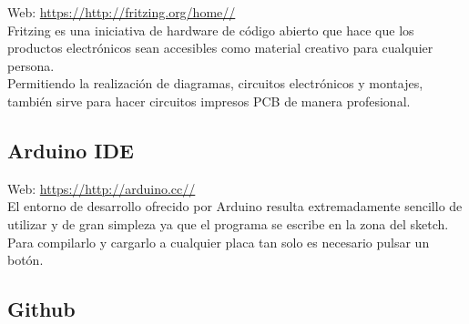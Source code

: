 
Web: \url{https://http://fritzing.org/home//} \cite{website:1} \\

Fritzing es una iniciativa de hardware de código abierto que hace que los productos electrónicos sean accesibles como material creativo para cualquier persona.\\

Permitiendo la realización de diagramas, circuitos electrónicos y montajes, también sirve para hacer circuitos impresos PCB de manera profesional.

\subsection{Arduino IDE}


Web: \url{https://http://arduino.cc//} \cite{website:1} \\

El entorno de desarrollo ofrecido por Arduino resulta extremadamente sencillo de utilizar y de gran simpleza ya que el programa se escribe en la zona del sketch. Para compilarlo y
cargarlo a cualquier placa tan solo es necesario pulsar un botón.\\


\subsection{Github}


